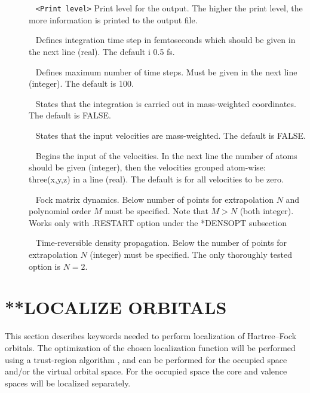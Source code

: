 \begin{description}
\item[]\verb| | \newline
\verb|<Print level>|\newline
Print level for the output. The higher the print level, the more information
is printed to the output file.
\item[]\verb| | \newline
Defines integration time step in femtoseconds which should be given in the next line (real). The
default i 0.5 fs.
\item[]\verb| | \newline
Defines maximum number of time steps. Must be given in the next line (integer). The default is 100.
\item[]\verb| | \newline 
States that the integration is carried out in mass-weighted coordinates. The default is FALSE.
\item[]\verb| | \newline 
States that the input velocities are mass-weighted. The default is FALSE.
\item[]\verb| | \newline 
Begins the input of the velocities. In the next line the number of atoms should be given (integer),
then the velocities grouped atom-wise: three(x,y,z) in a line (real). The default is for all 
velocities to be zero.
\item[]\verb| | \newline 
Fock matrix dynamics. Below number of points for extrapolation $N$ and polynomial order $M$ must
be specified. Note that $M>N$ (both integer). Works only with .RESTART option under the *DENSOPT subsection
\item[]\verb| | \newline 
Time-reversible density propagation. Below the number of points for extrapolation $N$ (integer)  must be specified.
The only thoroughly tested option is $N=2$.

\end{description}


\section{**LOCALIZE ORBITALS}\label{subsec:orbloc}

This section describes keywords needed to perform localization of Hartree--Fock orbitals. The optimization of the
chosen localization function will be performed using a trust-region algorithm \cite{hoyvik:TRM}, and can be performed for  the occupied space and/or the virtual orbital space. For the occupied space the core and valence spaces will be localized separately.  

